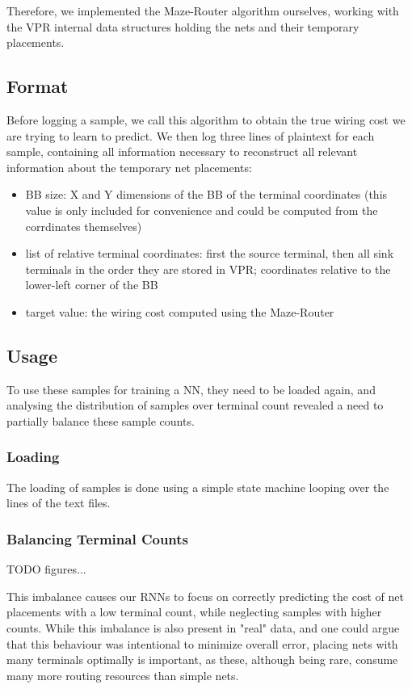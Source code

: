 Therefore, we implemented the Maze-Router algorithm ourselves, working with the \gls{VPR} internal data structures holding the nets and their temporary placements.

\subsection{Format}

Before logging a sample, we call this algorithm to obtain the true wiring cost we are trying to learn to predict. We then log three lines of plaintext for each sample, containing all information necessary to reconstruct all relevant information about the temporary net placements:

\begin{itemize}
	\item \gls{BB} size: X and Y dimensions of the \gls{BB} of the terminal coordinates (this value is only included for convenience and could be computed from the corrdinates themselves)
	\item list of relative terminal coordinates: first the source terminal, then all sink terminals in the order they are stored in \gls{VPR}; coordinates relative to the lower-left corner of the \gls{BB}
	\item target value: the wiring cost computed using the Maze-Router
\end{itemize}

\subsection{Usage}

To use these samples for training a \gls{NN}, they need to be loaded again, and analysing the distribution of samples over terminal count revealed a need to partially balance these sample counts.

\subsubsection{Loading}

The loading of samples is done using a simple state machine looping over the lines of the text files.

\subsubsection{Balancing Terminal Counts}

TODO figures...

This imbalance causes our \glspl{RNN}\cite{TODO only lstms} to focus on correctly predicting the cost of net placements with a low terminal count, while neglecting samples with higher counts. While this imbalance is also present in "real" data, and one could argue that this behaviour was intentional to minimize overall error, placing nets with many terminals optimally is important, as these, although being rare, consume many more routing resources than simple nets.

